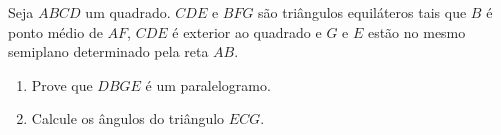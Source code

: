 Seja $ABCD$ um quadrado. $CDE$ e $BFG$ são triângulos equiláteros tais que $B$ é ponto médio de $AF$, $CDE$ é exterior ao quadrado e $G$ e $E$ estão no mesmo semiplano determinado pela reta $AB$.

\begin{enumerate}[label = (\alph*)]
	\item Prove que $DBGE$ é um paralelogramo.
	\item Calcule os ângulos do triângulo $ECG$.
\end{enumerate}
